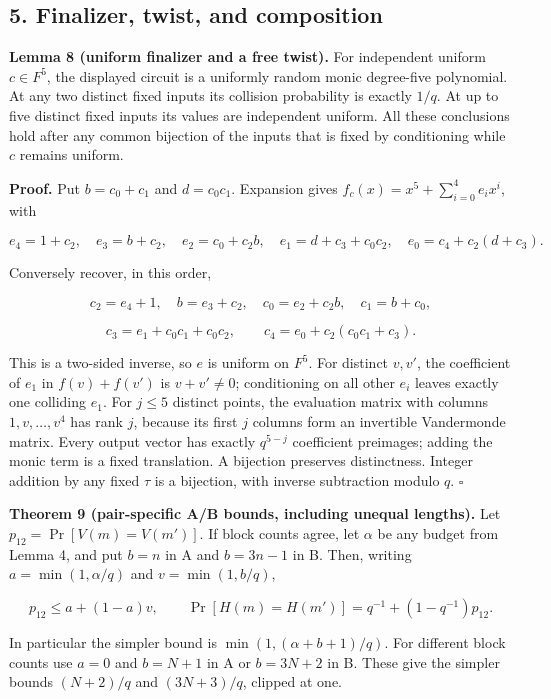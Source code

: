 \documentclass[
  11pt,
]{article}
\begin{document}
\subsection{5. Finalizer, twist, and
composition}\label{finalizer-twist-and-composition}

\textbf{Lemma 8 (uniform finalizer and a free twist).} For independent
uniform \(c\in F^5\), the displayed circuit is a uniformly random monic
degree-five polynomial. At any two distinct fixed inputs its collision
probability is exactly \(1/q\). At up to five distinct fixed inputs its
values are independent uniform. All these conclusions hold after any
common bijection of the inputs that is fixed by conditioning while \(c\)
remains uniform.

\textbf{Proof.} Put \(b=c_0+c_1\) and \(d=c_0c_1\). Expansion gives
\(f_c(x)=x^5+\sum_{i=0}^4e_ix^i\), with

\[
 e_4=1+c_2,\quad e_3=b+c_2,\quad e_2=c_0+c_2b,\quad
 e_1=d+c_3+c_0c_2,\quad e_0=c_4+c_2(d+c_3).
\]

Conversely recover, in this order,

\[
 c_2=e_4+1,\quad b=e_3+c_2,\quad c_0=e_2+c_2b,\quad c_1=b+c_0,
\]

\[ c_3=e_1+c_0c_1+c_0c_2,\qquad c_4=e_0+c_2(c_0c_1+c_3). \]

This is a two-sided inverse, so \(e\) is uniform on \(F^5\). For
distinct \(v,v'\), the coefficient of \(e_1\) in \(f(v)+f(v')\) is
\(v+v'\ne0\); conditioning on all other \(e_i\) leaves exactly one
colliding \(e_1\). For \(j\le5\) distinct points, the evaluation matrix
with columns \(1,v,\ldots,v^4\) has rank \(j\), because its first \(j\)
columns form an invertible Vandermonde matrix. Every output vector has
exactly \(q^{5-j}\) coefficient preimages; adding the monic term is a
fixed translation. A bijection preserves distinctness. Integer addition
by any fixed \(\tau\) is a bijection, with inverse subtraction modulo
\(q\). \(\square\)

\textbf{Theorem 9 (pair-specific A/B bounds, including unequal
lengths).} Let \(p_{12}=\Pr[V(m)=V(m')]\). If block counts agree, let
\(\alpha\) be any budget from Lemma 4, and put \(b=n\) in A and
\(b=3n-1\) in B. Then, writing \(a=\min(1,\alpha/q)\) and
\(v=\min(1,b/q)\),

\[ p_{12}\le a+(1-a)v,\qquad
 \Pr[H(m)=H(m')]=q^{-1}+(1-q^{-1})p_{12}.
\]

In particular the simpler bound is \(\min(1,(\alpha+b+1)/q)\). For
different block counts use \(a=0\) and \(b=N+1\) in A or \(b=3N+2\) in
B. These give the simpler bounds \((N+2)/q\) and \((3N+3)/q\), clipped
at one.
\end{document}
